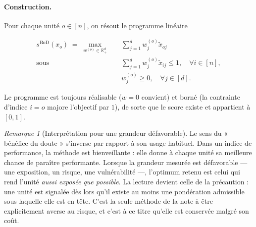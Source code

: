 \documentclass[11pt,a4paper]{article}
\theoremstyle{definition}
\theoremstyle{remark}
\newtheorem{remarque}{Remarque}[section]
\newcommand{\R}{\mathbb{R}}
\begin{document}
\bigskip

\paragraph{Construction.} Pour chaque unité $o \in [n]$, on résout le programme linéaire

\medskip

\[
  \begin{aligned}
    s^{\mathrm{BoD}}(x_o) \;=\; \max_{w^{(o)} \in \R_+^d} \quad
      & \sum_{j=1}^{d} w^{(o)}_j \tilde{x}_{oj} \\
    \text{sous} \quad
      & \sum_{j=1}^{d} w^{(o)}_j \tilde{x}_{ij} \le 1, \quad \forall i \in [n], \\
      & w^{(o)}_j \ge 0, \quad \forall j \in [d].
  \end{aligned}
  \tag{BoD}
\]

\bigskip

Le programme est toujours réalisable ($w = 0$ convient) et borné (la contrainte
d'indice $i = o$ majore l'objectif par $1$), de sorte que le score existe et appartient à
$[0,1]$.

\medskip

\begin{remarque}[Interprétation pour une grandeur défavorable]
  \label{rem:bod-inversion}
  Le sens du « bénéfice du doute » s'inverse par rapport à son usage habituel. Dans un
  indice de performance, la méthode est bienveillante : elle donne à chaque unité sa
  meilleure chance de paraître performante. Lorsque la grandeur mesurée est défavorable
  --- une exposition, un risque, une vulnérabilité ---, l'optimum retenu est celui qui
  rend l'unité \emph{aussi exposée que possible}. La lecture devient celle de la
  précaution : une unité est signalée dès lors qu'il existe au moins une pondération
  admissible sous laquelle elle est en tête. C'est la seule méthode de la note à être
  explicitement averse au risque, et c'est à ce titre qu'elle est conservée malgré son
  coût.
\end{remarque}

\bigskip
\end{document}
